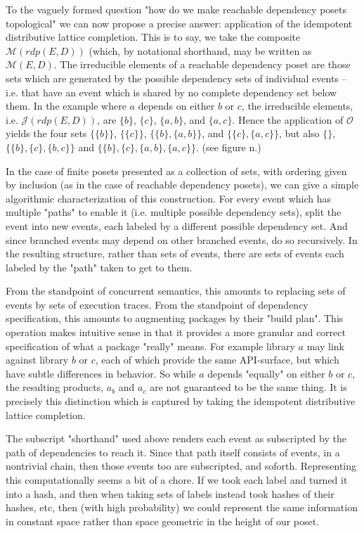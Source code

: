 \documentclass[hoptionsi,review,format=acmsmall]{acmart}
\theoremstyle{definition}
\newcommand{\Mcc}{\mathcal{M}}
\newcommand{\Oc}{\mathcal{O}}
\newcommand{\Jc}{\mathcal{J}}
\begin{document}
To the vaguely formed question "how do we make reachable dependency posets topological" we can now propose a precise answer: application of the idempotent distributive lattice completion. This is to say, we take the composite \(\Mcc(rdp(E,D))\) (which, by notational shorthand, may be written as \(\Mcc(E,D)\). The irreducible elements of a reachable dependency poset are those sets which are generated by the possible dependency sets of individual events -- i.e. that have an event which is shared by no complete dependency set below them. In the example where \(a\) depends on either \(b\) or \(c\), the irreducible elements, i.e. \(\Jc(rdp(E,D))\), are \(\{b\}\), \(\{c\}\), \(\{a,b\}\), and \(\{a,c\}\). Hence the application of \(\Oc\) yields the four sets \(\{\{b\}\}\), \(\{\{c\}\}\), \(\{\{b\},\{a,b\}\}\), and \(\{\{c\},\{a,c\}\}\), but also \(\{\}\), \(\{\{b\},\{c\},\{b,c\}\}\) and \(\{\{b\},\{c\},\{a,b\},\{a,c\}\}\). (see figure n.)


In the case of finite posets presented as a collection of sets, with ordering given by inclusion (as in the case of reachable dependency posets), we can give a simple algorithmic characterization of this construction. For every event which has multiple "paths" to enable it (i.e. multiple possible dependency sets), split the event into new events, each labeled by a different possible dependency set. And since branched events may depend on other branched events, do so recursively. In the resulting structure, rather than sets of events, there are sets of events each labeled by the "path" taken to get to them. 

From the standpoint of concurrent semantics, this amounts to replacing sets of events by sets of execution traces. From the standpoint of dependency specification, this amounts to augmenting packages by their "build plan". This operation makes intuitive sense in that it provides a more granular and correct specification of what a package "really" means. For example library \(a\) may link against library \(b\) or \(c\), each of which provide the same API-surface, but which have subtle differences in behavior. So while \(a\) depends "equally" on either \(b\) or \(c\), the resulting products, \(a_b\) and \(a_c\) are not guaranteed to be the same thing. It is precisely this distinction which is captured by taking the idempotent distributive lattice completion.

The subscript "shorthand" used above renders each event as subscripted by the path of dependencies to reach it. Since that path itself consists of events, in a nontrivial chain, then those events too are subscripted, and soforth. Representing this computationally seems a bit of a chore. If we took each label and turned it into a hash, and then when taking sets of labels instead took hashes of their hashes, etc, then (with high probability) we could represent the same information in constant space rather than space geometric in the height of our poset.
\end{document}
